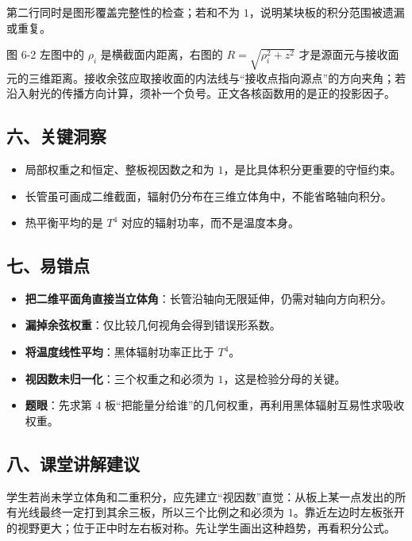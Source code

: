 \documentclass[12pt,a4paper,UTF8]{ctexart}
\newcommand{\tightlist}{\setlength{\itemsep}{0pt}\setlength{\parskip}{0pt}}
\begin{document}
第二行同时是图形覆盖完整性的检查；若和不为
\(1\)，说明某块板的积分范围被遗漏或重复。

图 6-2 左图中的 \(\rho_i\) 是横截面内距离，右图的
\(R=\sqrt{\rho_i^2+z^2}\)
才是源面元与接收面元的三维距离。接收余弦应取接收面的内法线与``接收点指向源点''的方向夹角；若沿入射光的传播方向计算，须补一个负号。正文各核函数用的是正的投影因子。

\subsection{六、关键洞察}\label{ux516dux5173ux952eux6d1eux5bdf-5}

\begin{itemize}
\tightlist
\item
  局部权重之和恒定、整板视因数之和为
  \(1\)，是比具体积分更重要的守恒约束。
\item
  长管虽可画成二维截面，辐射仍分布在三维立体角中，不能省略轴向积分。
\item
  热平衡平均的是 \(T^4\) 对应的辐射功率，而不是温度本身。
\end{itemize}

\subsection{七、易错点}\label{ux4e03ux6613ux9519ux70b9-5}

\begin{itemize}
\tightlist
\item
  \textbf{把二维平面角直接当立体角}：长管沿轴向无限延伸，仍需对轴向方向积分。
\item
  \textbf{漏掉余弦权重}：仅比较几何视角会得到错误形系数。
\item
  \textbf{将温度线性平均}：黑体辐射功率正比于 \(T^4\)。
\item
  \textbf{视因数未归一化}：三个权重之和必须为
  \(1\)，这是检验分母的关键。
\item
  \textbf{题眼}：先求第 4
  板``把能量分给谁''的几何权重，再利用黑体辐射互易性求吸收权重。
\end{itemize}

\subsection{八、课堂讲解建议}\label{ux516bux8bfeux5802ux8bb2ux89e3ux5efaux8bae-5}

学生若尚未学立体角和二重积分，应先建立``视因数''直觉：从板上某一点发出的所有光线最终一定打到其余三板，所以三个比例之和必须为
\(1\)。靠近左边时左板张开的视野更大；位于正中时左右板对称。先让学生画出这种趋势，再看积分公式。
\end{document}
